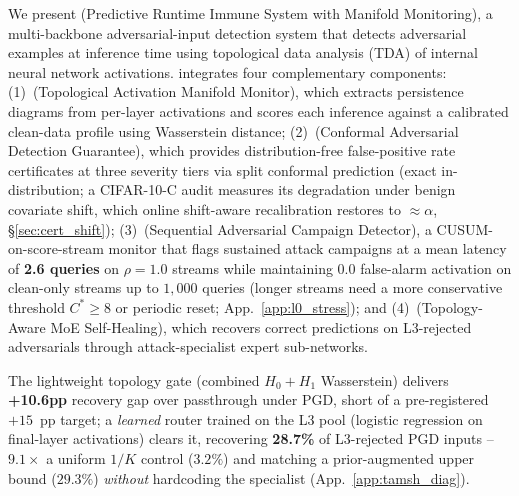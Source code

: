 We present \prism (Predictive Runtime Immune System with Manifold Monitoring), 
a multi-backbone adversarial-input detection system that detects adversarial 
examples at inference time using topological data analysis (TDA) of internal 
neural network activations. \prism integrates four complementary components: 
(1)~\tamm (Topological Activation Manifold Monitor), which extracts persistence 
diagrams from per-layer activations and scores each inference against a 
calibrated clean-data profile using Wasserstein distance; 
(2)~\cadg (Conformal Adversarial Detection Guarantee), which provides
distribution-free false-positive rate certificates at three severity tiers via
split conformal prediction (exact in-distribution; a CIFAR-10-C audit
measures its degradation under benign covariate shift, which online
shift-aware recalibration restores to ${\approx}\alpha$,
\S\ref{sec:cert_shift});
(3)~\sacd (Sequential Adversarial Campaign Detector), a CUSUM-on-score-stream
monitor that flags sustained attack campaigns at a mean latency of
\textbf{2.6 queries} on $\rho{=}1.0$ streams while maintaining $0.0$
false-alarm activation on clean-only streams up to $1{,}000$ queries
(longer streams need a more conservative threshold $C^*{\geq}8$ or
periodic reset; App.~\ref{app:l0_stress}); and
(4)~\tamsh (Topology-Aware MoE Self-Healing), which recovers correct
predictions on L3-rejected adversarials through attack-specialist expert
sub-networks.

The lightweight topology gate (combined $H_0{+}H_1$
Wasserstein) delivers \textbf{+10.6pp} recovery gap over passthrough under
PGD, short of a pre-registered $+15$~pp target; a \emph{learned} router
trained on the L3 pool (logistic regression on final-layer activations)
clears it, recovering \textbf{28.7\%} of L3-rejected PGD inputs --
$9.1\times$ a uniform $1/K$ control ($3.2\%$) and matching a
prior-augmented upper bound ($29.3\%$) \emph{without} hardcoding the
specialist (App.~\ref{app:tamsh_diag}).

